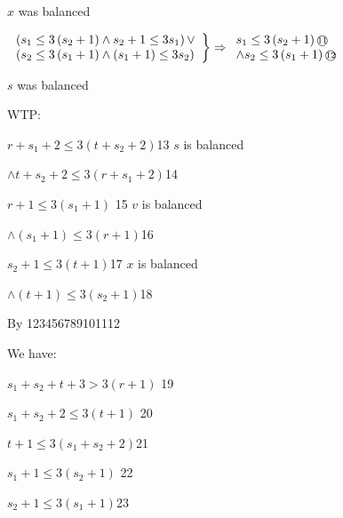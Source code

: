 \documentclass[12pt]{article}
\begin{document}
$x$ was balanced

$\left.\begin{array}{l}
\left(s_{1} \leq 3\left(s_{2}+1\right) \wedge s_{2}+1 \leq 3 s_{1}\right) \lor \\
\left(s_{2} \leq 3\left(s_{1}+1\right) \wedge\left(s_{1}+1\right) \leq 3 s_{2}\right)
\end{array}\right\} \Rightarrow\begin{array}{l}s_{1} \leq 3\left(s_{2}+1\right) \text{\small\textcircled{\scriptsize{11}}}\\
\wedge s_{2} \leq 3\left(s_{1}+1\right)\text{\small\textcircled{\scriptsize{12}}}\end{array}$

$s$ was balanced

WTP:

$r+s_{1}+2 \leqslant 3\left(t+s_{2}+2\right)${\small\textcircled{\scriptsize{13}}} $s$ is balanced

$\wedge t+s_{2}+2 \leq 3\left(r+s_{1}+2\right)${\small\textcircled{\scriptsize{14}}}

$r+1 \leqslant 3\left(s_{1}+1\right)$ {\small\textcircled{\scriptsize{15}}} $v$ is balanced

$\wedge(s_1+1) \leqslant 3(r+1)${\small\textcircled{\scriptsize{16}}}

$s_{2}+1 \leq 3(t+1)${\small\textcircled{\scriptsize{17}}} $x$ is balanced

$\wedge(t+1) \leq 3\left(s_{2}+1\right)${\small\textcircled{\scriptsize{18}}}

By {\small\textcircled{\scriptsize{1}}}{\small\textcircled{\scriptsize{2}}}{\small\textcircled{\scriptsize{3}}}{\small\textcircled{\scriptsize{4}}}{\small\textcircled{\scriptsize{5}}}{\small\textcircled{\scriptsize{6}}}{\small\textcircled{\scriptsize{7}}}{\small\textcircled{\scriptsize{8}}}{\small\textcircled{\scriptsize{9}}}{\small\textcircled{\scriptsize{10}}}{\small\textcircled{\scriptsize{11}}}{\small\textcircled{\scriptsize{12}}}

We have:

$s_{1}+s_{2}+t+3>3(r+1)$ {\small\textcircled{\scriptsize{19}}}

$s_{1}+s_{2}+2 \leq 3(t+1)$ {\small\textcircled{\scriptsize{20}}}

$ t+1 \leq 3\left(s_{1}+s_{2}+2\right) ${\small\textcircled{\scriptsize{21}}}

$s_{1}+1 \leq 3\left(s_{2}+1\right)$ {\small\textcircled{\scriptsize{22}}}

$ s_{2}+1 \leq 3\left(s_{1}+1\right)${\small\textcircled{\scriptsize{23}}}
\end{document}
